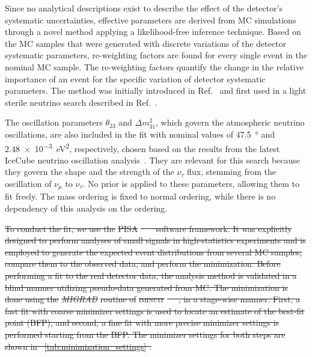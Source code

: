 \documentclass[
    aps,
    prd,
    reprint,
    amsmath,
    amssymb,
    nofootinbib,
    linenumbers,
    superscriptaddress,
    floatfix
]{revtex4-2}
\providecommand{\DIFdeltex}[1]{{\protect\color{red}\sout{#1}}}                      %
\providecommand{\DIFdelbegin}{} %
\providecommand{\DIFdel}[1]{\texorpdfstring{\DIFdeltex{#1}}{}} %
\newcommand{\DIFscaledelfig}{0.5}
\newlength{\DIFdelgraphicswidth} %
\newlength{\DIFdelgraphicsheight} %
\newcommand{\DIFdelincludegraphics}[2][]{%
\sbox{\DIFdelgraphicsbox}{\DIFOincludegraphics[#1]{#2}}%
\settoboxwidth{\DIFdelgraphicswidth}{\DIFdelgraphicsbox} %
\settoboxtotalheight{\DIFdelgraphicsheight}{\DIFdelgraphicsbox} %
\scalebox{\DIFscaledelfig}{%
\parbox[b]{\DIFdelgraphicswidth}{\usebox{\DIFdelgraphicsbox}\\[-\baselineskip] \rule{\DIFdelgraphicswidth}{0em}}\llap{\resizebox{\DIFdelgraphicswidth}{\DIFdelgraphicsheight}{%
\setlength{\unitlength}{\DIFdelgraphicswidth}%
\begin{picture}(1,1)%
\thicklines\linethickness{2pt} %
{\color[rgb]{1,0,0}\put(0,0){\framebox(1,1){}}}%
{\color[rgb]{1,0,0}\put(0,0){\line( 1,1){1}}}%
{\color[rgb]{1,0,0}\put(0,1){\line(1,-1){1}}}%
\end{picture}%
}\hspace*{3pt}}} %
} %
\DeclareRobustCommand{\DIFdelbegin}{\DIFOdelbegin \let\includegraphics\DIFdelincludegraphics} %
\begin{document}
Since no analytical descriptions exist to describe the effect of the detector's systematic uncertainties, effective parameters are derived from MC simulations through a novel method applying a likelihood-free inference technique.
Based on the MC samples that were generated with discrete variations of the detector systematic parameters, re-weighting factors are found for every single event in the nominal MC sample.
The re-weighting factors quantify the change in the relative importance of an event for the specific variation of detector systematic parameters. The method was initially introduced in Ref.~\cite{Fischer_2023} and first used in a light sterile neutrino search described in Ref.~\cite{Abbasi:2024ktc}.

The oscillation parameters $\theta_{23}$ and $\Delta m^{2}_{31}$, which govern the atmospheric neutrino oscillations, are also included in the fit with nominal values of \SI{47.5}{\degree} and \SI{2.48e-3}{\electronvolt^2}, respectively, chosen based on the results from the latest IceCube neutrino oscillation analysis~\cite{IceCube:2024xjj}.
They are relevant for this search because they govern the shape and the strength of the $\nu_\tau$ flux, stemming from the oscillation of $\nu_\mu$ to $\nu_\tau$.
No prior is applied to these parameters, allowing them to fit freely.
The mass ordering is fixed to normal ordering, while there is no dependency of this analysis on the ordering.



\DIFdelbegin \DIFdel{To conduct the fit, we use the }\textsc{\DIFdel{PISA}}%
\DIFdel{~\mbox{%
\cite{pisa_paper, pisa_software} }\hspace{0pt}%
software framework.
It was explicitly designed to perform analyses of small signals in high-statistics experiments and is employed to generate the expected event distributions from several MC samples, compare them to the observed data, and perform the minimization.
Before performing a fit to the real detector data, the analysis method is validated in a blind manner utilizing pseudo-data generated from MC.
The minimization is done using the }\textit{\DIFdel{MIGRAD}} %
\DIFdel{routine of }\textsc{\DIFdel{iminuit}}%
\DIFdel{~\mbox{%
\cite{iminuit_v2.17.0}}\hspace{0pt}%
, in  a stage-wise manner.
First, a fast fit with coarse minimizer settings is used to locate an estimate of the best-fit point (BFP), and second, a fine fit with more precise minimizer settings is performed starting from the BFP.
The minimizer settings for both steps are shown in \mbox{%
\cref{tab:minimization_settings}}\hspace{0pt}%
.
}%
\end{document}
